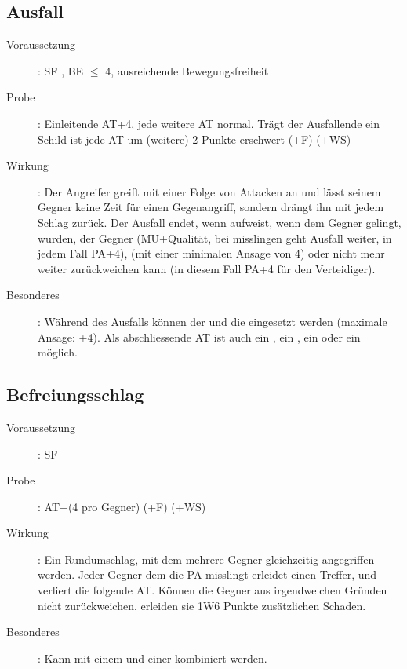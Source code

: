 \subsection{Ausfall }
\label{chap.bAT.ausfall}
\begin{description}
    \item[Voraussetzung]: SF , BE \textrm{${\leq}$} 4,
        ausreichende Bewegungsfreiheit
    \item[Probe]: Einleitende AT+4, jede weitere AT normal.  Trägt der
        Ausfallende ein Schild ist jede AT um (weitere) 2 Punkte erschwert (+F)
        (+WS)
    \item[Wirkung]: Der Angreifer greift mit einer Folge von Attacken an und
        lässt seinem Gegner keine Zeit für einen Gegenangriff, sondern drängt
        ihn mit jedem Schlag zurück. Der Ausfall endet, wenn
         aufweist, wenn
        dem Gegner  gelingt,
         wurden, der Gegner
         (MU+Qualität, bei misslingen
        geht Ausfall weiter, in jedem Fall PA+4),
         (mit einer minimalen
        Ansage von 4) oder nicht mehr weiter zurückweichen kann (in diesem Fall
        PA+4 für den Verteidiger).
    \item[Besonderes]: Während des Ausfalls können der 
        und die  eingesetzt werden (maximale Ansage: +4).
        Als abschliessende AT ist auch ein , ein , ein
         oder ein 
        möglich.
\end{description}

\subsection{Befreiungsschlag }
\label{chap.bAT.befreiungsschlag}
\begin{description}
    \item[Voraussetzung]: SF 
    \item[Probe]: AT+(4 pro Gegner) (+F) (+WS)
    \item[Wirkung]: Ein Rundumschlag, mit dem mehrere Gegner gleichzeitig
        angegriffen werden. Jeder Gegner dem die PA misslingt erleidet einen
        Treffer, und verliert die folgende AT. Können die Gegner aus
        irgendwelchen Gründen nicht zurückweichen, erleiden sie 1W6 Punkte
        zusätzlichen Schaden.
    \item[Besonderes]: Kann mit einem  und einer
         kombiniert werden.
\end{description}

